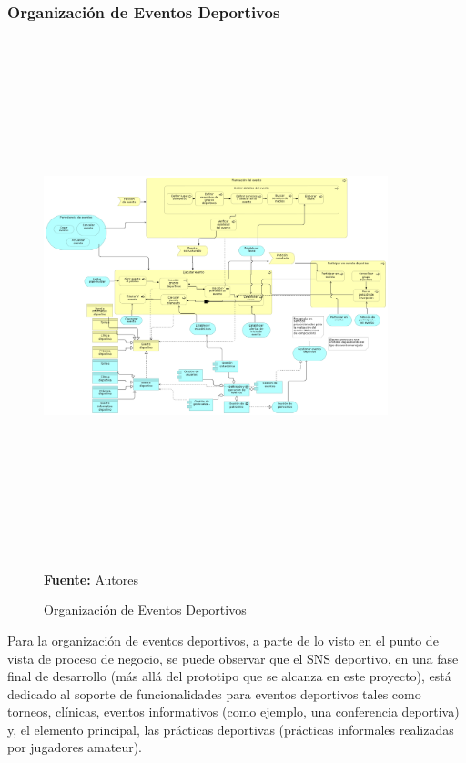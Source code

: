 \subsubsection{Organización de Eventos Deportivos}

\begin{figure}[!htb]
  \begin{center}
    \includegraphics[angle=90,width=10cm,height=15cm]{./imagenes/Archimate/vistas/application_usage/organizacioneventosdeportivos.png}
    \caption{Organización de Eventos Deportivos}
    \label{fig:au_organizacion_eventos_deportivos}
    \textbf{Fuente:}  Autores \\
  \end{center}
\end{figure}

Para la organización de eventos deportivos, a parte de lo visto en el punto de vista de proceso de negocio, se puede observar que el SNS deportivo, en una fase final de desarrollo (más allá del prototipo que se alcanza en este proyecto), está dedicado al soporte de funcionalidades para eventos deportivos tales como torneos, clínicas, eventos informativos (como ejemplo, una conferencia deportiva) y, el elemento principal, las prácticas deportivas (prácticas informales realizadas por jugadores amateur).

